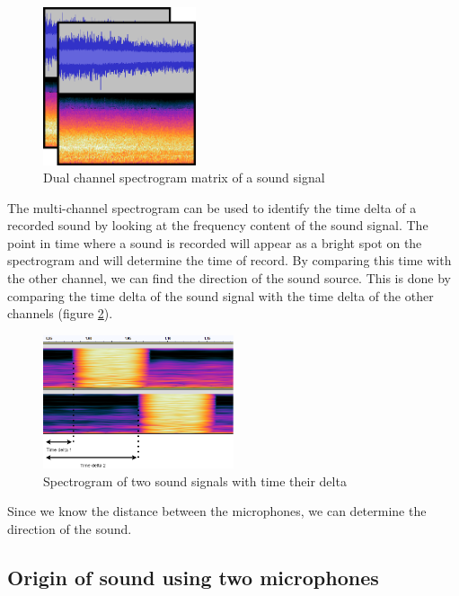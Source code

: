 \begin{figure}[H]
    \centering
    \includegraphics[width=0.4\textwidth]{../Images/2-channel-spectrogram-example.png}
    \caption{Dual channel spectrogram matrix of a sound signal}
    \label{fig:2_channel_spectrogram_example}
\end{figure}

The multi-channel spectrogram can be used to identify the time delta of a recorded sound by looking at the frequency content of the sound signal. The point in time where a sound is recorded will appear as a bright spot on the spectrogram and will determine the time of record. By comparing this time with the other channel, we can find the direction of the sound source. This is done by comparing the time delta of the sound signal with the time delta of the other channels (figure \ref*{fig:spectrogram_offset}).

\begin{figure}[H]
    \centering
    \includegraphics[width=0.5\textwidth]{../Images/time_delta.png}
    \caption{Spectrogram of two sound signals with time their delta}
    \label{fig:spectrogram_offset}
\end{figure}

Since we know the distance between the microphones, we can determine the direction of the sound.

\subsection{Origin of sound using two microphones}

